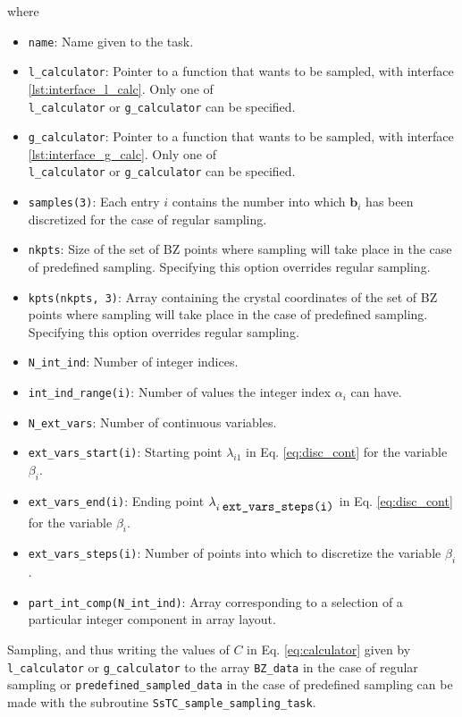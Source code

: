 \documentclass[10pt,a4paper]{article}
\begin{document}
where
\begin{tcolorbox}
\begin{itemize}
\item \verb|name|: Name given to the task.
\item \verb|l_calculator|: Pointer to a function that wants to be sampled, with interface \ref{lst:interface_l_calc}. Only one of \\ \verb|l_calculator| or \verb|g_calculator| can be specified.
\item \verb|g_calculator|: Pointer to a function that wants to be sampled, with interface \ref{lst:interface_g_calc}. Only one of \\ \verb|l_calculator| or \verb|g_calculator| can be specified.
\item \verb|samples(3)|: Each entry $i$ contains the number into which $\bm{b}_i$ has been discretized for the case of regular sampling.
\item \verb|nkpts|: Size of the set of BZ points where sampling will take place in the case of predefined sampling. Specifying this option overrides regular sampling.
\item \verb|kpts(nkpts, 3)|: Array containing the crystal coordinates of the set of BZ points where sampling will take place in the case of predefined sampling. Specifying this option overrides regular sampling.
\item \verb|N_int_ind|: Number of integer indices.
\item \verb|int_ind_range(i)|: Number of values the integer index $\alpha_i$ can have.
\item \verb|N_ext_vars|: Number of continuous variables.
\item \verb|ext_vars_start(i)|: Starting point $\lambda_{i1}$ in Eq. \eqref{eq:disc_cont} for the variable $\beta_i$.
\item \verb|ext_vars_end(i)|: Ending point $\lambda_{i\;\verb|ext_vars_steps(i)|}$ in Eq. \eqref{eq:disc_cont} for the variable $\beta_i$.
\item \verb|ext_vars_steps(i)|: Number of points into which to discretize the variable $\beta_i$.
\item \verb|part_int_comp(N_int_ind)|: Array corresponding to a selection of a particular integer component in array layout.
\end{itemize}
\end{tcolorbox}
Sampling, and thus writing the values of $C$ in Eq. \eqref{eq:calculator} given by \verb|l_calculator| or \verb|g_calculator| to the array \verb|BZ_data| in the case of regular sampling or  \verb|predefined_sampled_data| in the case of predefined sampling can be made with the subroutine \verb|SsTC_sample_sampling_task|.
\end{document}
